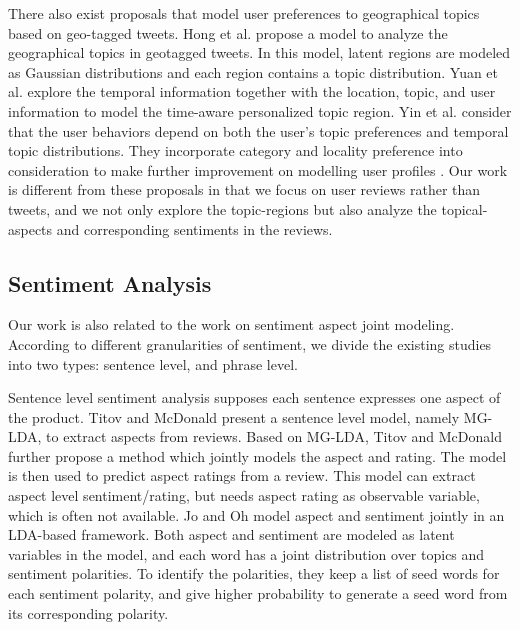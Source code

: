 There also exist proposals \cite{Hong:2012,YuanW4:2013,Yin:2014TKDD} that model user
preferences to geographical topics based on geo-tagged tweets.
Hong et al. \cite{Hong:2012} propose a model to analyze the
geographical topics in geotagged tweets.
In this model, latent regions are modeled as Gaussian distributions
and each region contains a topic distribution.
Yuan et al. \cite{YuanW4:2013}
explore the temporal information together with the
location, topic, and user information to model the time-aware
personalized topic region.
Yin et al. \cite{Yin:2014:TCM} consider that the user behaviors 
depend on both the user's topic preferences and temporal topic
distributions. They incorporate category
and locality preference into consideration to make
further improvement on modelling user profiles \cite{Yin:2014TKDD}.
Our work is
different from these proposals in that we focus on user reviews
rather than tweets, and we not only explore the topic-regions
but also analyze the topical-aspects and
corresponding sentiments in the reviews.

\subsection{Sentiment Analysis}
Our work is also related to the work on sentiment
aspect joint modeling.
According to different granularities of sentiment,
we divide the existing studies into two types:
sentence level, and phrase level.

Sentence level sentiment analysis supposes each
sentence expresses one aspect of the product.
Titov and McDonald \cite{TitovMGLDA:2008}
present a sentence level model, namely MG-LDA, to extract
aspects from reviews.
Based on MG-LDA, Titov and McDonald further
propose a method \cite{TitovMAS:2008} which jointly
models the aspect and rating. The model is then used to predict
aspect ratings from a review. This model can extract aspect level
sentiment/rating, but needs aspect rating as
observable variable, which is often not available.
Jo and Oh \cite{JoASUM:2011}
model aspect and sentiment jointly in an LDA-based framework.
Both aspect and sentiment are modeled as latent variables in the model, and each
word has a joint distribution over topics and sentiment polarities. To identify
the polarities, they keep a list of seed words for each sentiment polarity,
and give higher probability to generate a
seed word from its corresponding polarity.

